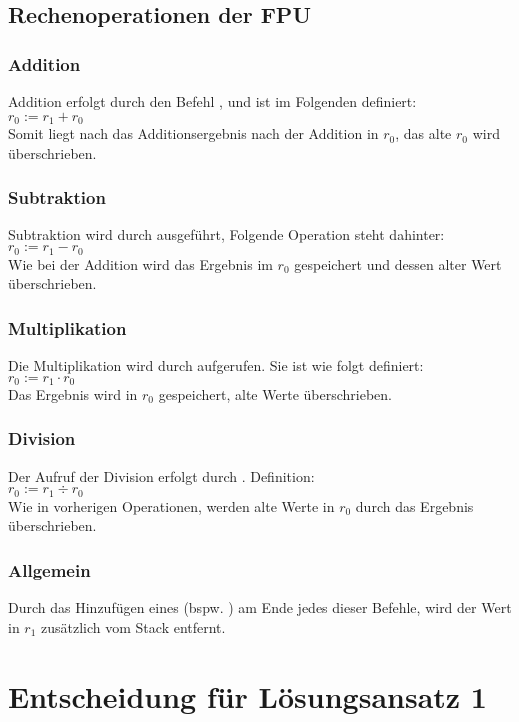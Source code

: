 \documentclass{article}
\begin{document}
	\subsection{Rechenoperationen der FPU}
		\subsubsection{Addition}
			Addition erfolgt durch den Befehl , und ist im Folgenden definiert:\\
			$r_0 := r_1 + r_0$ \\
			Somit liegt nach das Additionsergebnis nach der Addition in $r_0$, das alte $r_0$ wird überschrieben.
		\subsubsection{Subtraktion}
			Subtraktion wird durch  ausgeführt, Folgende Operation steht dahinter:\\
			$r_0 := r_1 - r_0$\\
			Wie bei der Addition wird das Ergebnis im $r_0$ gespeichert und dessen alter Wert überschrieben.
		\subsubsection{Multiplikation}
			Die Multiplikation wird durch  aufgerufen. Sie ist wie folgt definiert:\\
			$r_0 := r_1 \cdot r_0$\\
			Das Ergebnis wird in $r_0$ gespeichert, alte Werte überschrieben.
		\subsubsection{Division}
			Der Aufruf der Division erfolgt durch . Definition:\\
			$r_0 := r_1 \div r_0$\\
			Wie in vorherigen Operationen, werden alte Werte in $r_0$ durch das Ergebnis überschrieben.
		\subsubsection{Allgemein}
		Durch das Hinzufügen eines  (bspw. ) am Ende jedes dieser Befehle, wird der Wert in $r_1$ zusätzlich vom Stack entfernt.


\section{Entscheidung für Lösungsansatz 1}
\end{document}
